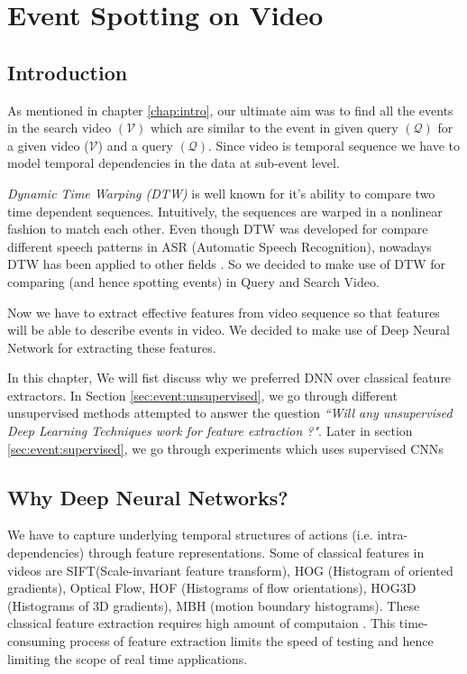 \chapter{Event Spotting on Video}
\label{chap:event}

\section{Introduction}
As mentioned in chapter \ref{chap:intro}, our ultimate aim was to find all the events in the search video $(\mathcal{V})$ which are similar to the event in given query $(\mathcal{Q})$  for a given video ($\mathcal{V}$) and a query $(\mathcal{Q})$. Since video is temporal sequence we have to model temporal dependencies
in the data at sub-event level. 

\textit{Dynamic Time Warping (DTW)} is well known for it's ability to compare two time dependent sequences. Intuitively, the sequences are warped in a nonlinear fashion to match each other. Even though DTW was developed for compare different speech patterns in ASR (Automatic Speech Recognition), nowadays DTW has been applied to other fields \cite{muller2007information}.  So we decided to make use of DTW for comparing (and hence spotting events) in Query and Search Video.

Now we have to extract effective features from video sequence so that features will be able to describe events  in video. We decided to make use of Deep Neural Network for extracting these features. 

In this chapter, We will fist discuss why we preferred  DNN over classical feature extractors. In Section \ref{sec:event:unsupervised}, we go through different unsupervised methods attempted to answer the question \textit{``Will any unsupervised Deep Learning Techniques work for feature extraction ?"}. Later in section \ref{sec:event:supervised}, we go through experiments which uses supervised CNNs  

\section{Why Deep Neural Networks?}
\label{sec:event:why}
We have to capture underlying temporal structures of actions (i.e. intra-dependencies) through feature representations. Some of classical features in videos are SIFT(Scale-invariant feature transform), HOG (Histogram of oriented gradients), Optical Flow, HOF (Histograms of flow orientations), HOG3D (Histograms of 3D gradients), MBH (motion boundary histograms). These classical feature extraction requires high amount of computaion \cite{baker2011database,chatfield2011devil}. This time-consuming process of feature extraction limits the speed of testing and hence limiting the scope of real time applications.

